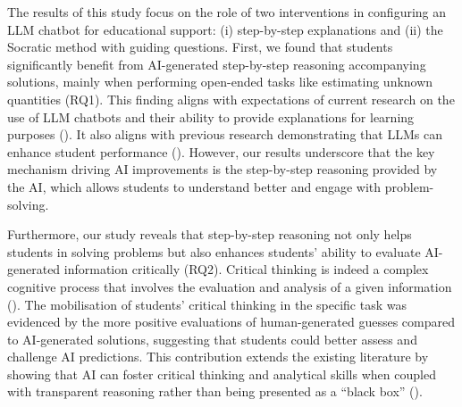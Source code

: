\documentclass[
  12pt,
]{article}
\begin{document}
The results of this study focus on the role of two interventions in configuring an LLM chatbot for educational support: (i) step-by-step explanations and (ii) the Socratic method with guiding questions. First, we found that students significantly benefit from AI-generated step-by-step reasoning accompanying solutions, mainly when performing open-ended tasks like estimating unknown quantities (RQ1). This finding aligns with expectations of current research on the use of LLM chatbots and their ability to provide explanations for learning purposes (). It also aligns with previous research demonstrating that LLMs can enhance student performance (). However, our results underscore that the key mechanism driving AI improvements is the step-by-step reasoning provided by the AI, which allows students to understand better and engage with problem-solving.

Furthermore, our study reveals that step-by-step reasoning not only helps students in solving problems but also enhances students' ability to evaluate AI-generated information critically (RQ2). Critical thinking is indeed a complex cognitive process that involves the evaluation and analysis of a given information (). The mobilisation of students' critical thinking in the specific task was evidenced by the more positive evaluations of human-generated guesses compared to AI-generated solutions, suggesting that students could better assess and challenge AI predictions. This contribution extends the existing literature by showing that AI can foster critical thinking and analytical skills when coupled with transparent reasoning rather than being presented as a ``black box'' ().
\end{document}

